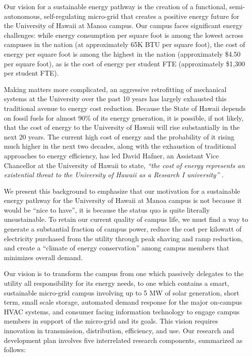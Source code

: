 Our vision for a sustainable energy pathway is the creation of a
functional, semi-autonomous, self-regulating micro-grid that creates a
positive energy future for the University of Hawaii at Manoa campus. Our
campus faces significant energy challenges: while energy
consumption per square foot is among the lowest across campuses in the
nation (at approximately 65K BTU per square foot), the cost of energy per
square foot is among the highest in the nation (approximately \$4.50 per
square foot), as is the cost of energy per student FTE (approximately
\$1,300 per student FTE).  

Making matters more complicated, an aggressive retrofitting of mechanical
systems at the University over the past 10 years has largely exhausted this
traditional avenue to energy cost reduction.  Because the State of Hawaii
depends on fossil fuels for almost 90\% of its energy generation, it is
possible, if not likely, that the cost of energy to the University of
Hawaii will rise substantially in the next 20 years. The current high cost
of energy and the probability of it rising much higher in the next two
decades, along with the exhaustion of traditional approaches to energy
efficiency, has led David Hafner, an Assistant Vice Chancellor at the
University of Hawaii to state, {\em ``the cost of energy represents an
  existential threat to the University of Hawaii as a Research I
  university''} \cite{Hafner2011}.

We present this background to emphasize that our motivation for a
sustainable energy pathway for the University of Hawaii at Manoa campus is
not because it would be ``nice to have'', it is because the status quo is
quite literally unsustainable.  To retain our current quality of campus
life, we must find a way to generate a substantial fraction of campus
power, reduce the cost per kilowatt of electricity purchased from the
utility through peak shaving and ramp reduction, and create a ``climate of
energy conservation'' among campus members that minimizes overall demand. 

Our vision is to transform the campus from one which passively delegates to
the utility all responsibility for its energy needs, to one which contains
a smart, sustainable micro-grid campus involving up to 5 MW of solar
generation, short term, small scale storage, automated demand response for
the major on-campus HVAC systems, and consumer facing information
technology to engage campus members in support of the micro-grid and its
goals.  This vision requires innovation in transmission, distribution,
efficiency, and use.  Our research and development plan involves five
interrelated research components, summarized as follows:

